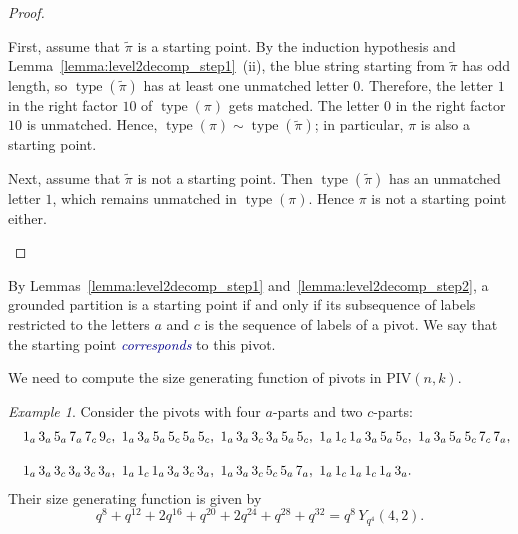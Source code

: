 \documentclass[11pt]{article}
\theoremstyle{definition}
\theoremstyle{remark}
\newtheorem{example}[theorem]{Example}
\theoremstyle{definition}
\numberwithin{equation}{section}
\newcommand{\type}{\operatorname{type}}
\renewcommand\emph[1]{\textcolor{darkblue}{\it #1}}
\begin{document}
\begin{proof}
\begin{enumerate}[label=(2\alph*)]
First, assume that \(\tilde{\pi}\) is a starting point. By the induction hypothesis and Lemma~\ref{lemma:level2decomp_step1}~(ii), the blue string starting from \(\tilde{\pi}\) has odd length, so \(\type(\tilde{\pi})\) has at least one unmatched letter \(0\). Therefore, the letter \(1\) in the right factor \(10\) of \(\type(\pi)\) gets matched. The letter \(0\) in the right factor \(10\) is unmatched. Hence, \(\type(\pi)\sim\type(\tilde{\pi})\); in particular, \(\pi\) is also a starting point.

Next, assume that \(\tilde{\pi}\) is not a starting point. Then \(\type(\tilde{\pi})\) has an unmatched letter \(1\), which remains unmatched in \(\type(\pi)\). Hence \(\pi\) is not a starting point either.\qedhere
\end{enumerate}
\end{proof}

By Lemmas~\ref{lemma:level2decomp_step1} and~\ref{lemma:level2decomp_step2}, a grounded partition is a starting point if and only if its subsequence of labels restricted to the letters \(a\) and \(c\) is the sequence of labels of a pivot. We say that the starting point \emph{corresponds} to this pivot.

We need to compute the size generating function of pivots in $\mathrm{PIV}(n,k)$.

\begin{example}
Consider the pivots with four $a$-parts and two $c$-parts:
\[
\begin{aligned}
&\quad \textcolor{black}{1_a}\,\textcolor{black}{3_a}\,\textcolor{black}{5_a}\,\textcolor{black}{7_a}\,\textcolor{black}{7_c}\,\textcolor{black}{9_c}, \ 
\textcolor{black}{1_a}\,\textcolor{black}{3_a}\,\textcolor{black}{5_a}\,\textcolor{black}{5_c}\,\textcolor{black}{5_a}\,\textcolor{black}{5_c}, \ 
\textcolor{black}{1_a}\,\textcolor{black}{3_a}\,\textcolor{black}{3_c}\,\textcolor{black}{3_a}\,\textcolor{black}{5_a}\,\textcolor{black}{5_c}, \ 
\textcolor{black}{1_a}\,\textcolor{black}{1_c}\,\textcolor{black}{1_a}\,\textcolor{black}{3_a}\,\textcolor{black}{5_a}\,\textcolor{black}{5_c}, \ 
\textcolor{black}{1_a}\,\textcolor{black}{3_a}\,\textcolor{black}{5_a}\,\textcolor{black}{5_c}\,\textcolor{black}{7_c}\,\textcolor{black}{7_a}, \\[1em]
&\quad \textcolor{black}{1_a}\,\textcolor{black}{3_a}\,\textcolor{black}{3_c}\,\textcolor{black}{3_a}\,\textcolor{black}{3_c}\,\textcolor{black}{3_a}, \ 
\textcolor{black}{1_a}\,\textcolor{black}{1_c}\,\textcolor{black}{1_a}\,\textcolor{black}{3_a}\,\textcolor{black}{3_c}\,\textcolor{black}{3_a}, \ 
\textcolor{black}{1_a}\,\textcolor{black}{3_a}\,\textcolor{black}{3_c}\,\textcolor{black}{5_c}\,\textcolor{black}{5_a}\,\textcolor{black}{7_a}, \ 
\textcolor{black}{1_a}\,\textcolor{black}{1_c}\,\textcolor{black}{1_a}\,\textcolor{black}{1_c}\,\textcolor{black}{1_a}\,\textcolor{black}{3_a}.
\end{aligned}
\]
Their size generating function is given by
\[q^8+q^{12}+2q^{16}+q^{20}+2q^{24}+q^{28}+q^{32} = q^8\,Y_{q^4}(4,2).\]
\end{example}
\end{document}

